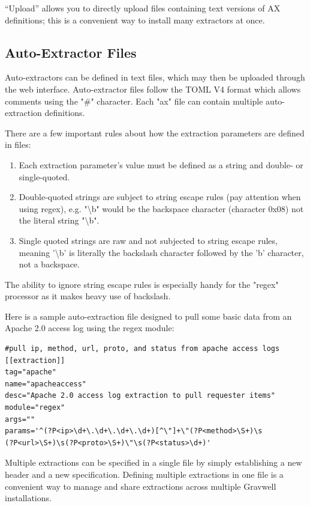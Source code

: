 ``Upload'' allows you to directly upload files containing text versions of AX definitions; this is a convenient way to install many extractors at once.

\subsection{Auto-Extractor Files}

Auto-extractors can be defined in text files, which may then be uploaded through
the web interface. Auto-extractor files follow the TOML V4 format which allows comments
using the "\#" character. Each "ax" file can contain multiple
auto-extraction definitions.

There are a few important rules about how the extraction parameters are
defined in files:

\begin{enumerate}
\tightlist
\item
  Each extraction parameter's value must be defined as a string and
  double- or single-quoted.
\item
  Double-quoted strings are subject to string escape rules (pay
  attention when using regex), e.g. "\textbackslash{}b" would be the backspace character (character 0x08)
  not the literal string "\textbackslash{}b".
\item
  Single quoted strings are raw and not subjected to string escape
  rules, meaning '\textbackslash{}b' is literally the backslash character followed
  by the 'b' character, not a backspace.
\end{enumerate}

The ability to ignore string escape rules is especially handy for the
"regex" processor as it makes heavy use of backslash.

Here is a sample auto-extraction file designed to pull some basic data
from an Apache 2.0 access log using the regex module:

\begin{Verbatim}[breaklines=true]
#pull ip, method, url, proto, and status from apache access logs
[[extraction]]
tag="apache"
name="apacheaccess"
desc="Apache 2.0 access log extraction to pull requester items"
module="regex"
args=""
params='^(?P<ip>\d+\.\d+\.\d+\.\d+)[^\"]+\"(?P<method>\S+)\s
(?P<url>\S+)\s(?P<proto>\S+)\"\s(?P<status>\d+)'
\end{Verbatim}

Multiple extractions can be specified in a single file by simply
establishing a new \code{[[extraction]]} header and a new
specification. Defining multiple extractions in one file is a convenient
way to manage and share extractions across multiple Gravwell installations.

